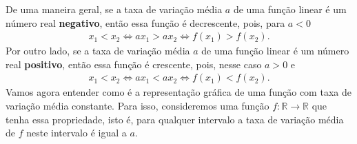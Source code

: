 De uma maneira geral, se a taxa de variação média \(a\) de uma função linear é um número real \textbf{negativo}, então essa função é decrescente, pois, para \(a<0\)
\begin{equation*}
\begin{split}x_1<x_2 \Longleftrightarrow ax_1>ax_2 \Longleftrightarrow f(x_1)>f(x_2).\end{split}
\end{equation*}
Por outro lado, se a taxa de variação média \(a\) de uma função linear é um número real \textbf{positivo}, então essa função é crescente, pois, nesse caso \(a>0\) e
\begin{equation*}
\begin{split}x_1<x_2 \Longleftrightarrow ax_1<ax_2 \Longleftrightarrow f(x_1)<f(x_2).\end{split}
\end{equation*}
Vamos agora entender como é a representação gráfica de uma função com taxa de variação média constante. Para isso, consideremos uma função \(f:\mathbb{R}\to\mathbb{R}\) que tenha essa propriedade, isto é, para qualquer intervalo a taxa de variação média de \(f\) neste intervalo é igual a \(a\).

